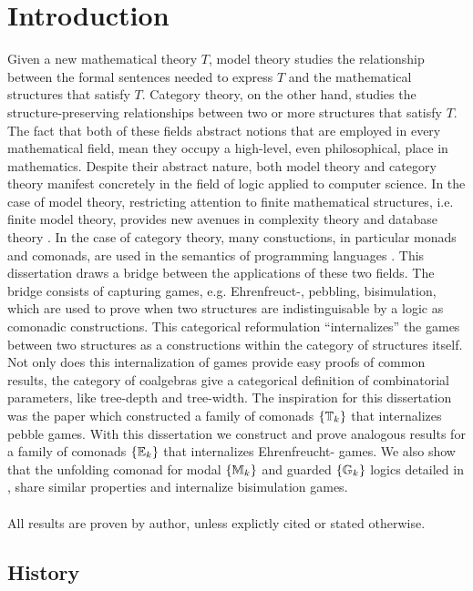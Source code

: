 \chapter{Introduction} 
Given a new mathematical theory $T$, model theory studies the relationship between the formal sentences needed to express $T$ and the mathematical structures that satisfy $T$. Category theory, on the other hand, studies the structure-preserving relationships between two or more structures that satisfy $T$. The fact that both of these fields abstract notions that are employed in every mathematical field, mean they occupy a high-level, even philosophical\cite{Mancosu2010}\cite{Landry2017}, place in mathematics. Despite their abstract nature, both model theory and category theory manifest concretely in the field of logic applied to computer science. In the case of model theory, restricting attention to finite mathematical structures, i.e. finite model theory, provides new avenues in complexity theory \cite{Immerman1998} and database theory \cite{Abiteboul1995}. In the case of category theory, many constuctions, in particular monads and comonads, are used in the semantics of programming languages \cite{BrookesGeva1992}. This dissertation draws a bridge between the applications of these two fields. The bridge consists of capturing games, e.g. Ehrenfreuct-{\Fraisse}, pebbling, bisimulation, which are used to prove when two structures are indistinguisable by a logic as comonadic constructions. This categorical reformulation ``internalizes'' the games between two structures as a constructions within the category of structures itself. Not only does this internalization of games provide easy proofs of common results, the category of coalgebras give a categorical definition of combinatorial parameters, like tree-depth and tree-width. The inspiration for this dissertation was the paper \cite{Abramsky2017} which constructed a family of comonads $\{{\mathbb{T}_{k}}\}$ that internalizes pebble games. With this dissertation we construct and prove analogous results for a family of comonads $\{{\mathbb{E}_{k}}\}$ that internalizes Ehrenfreucht-{\Fraisse} games. We also show that the unfolding comonad for modal $\{{\mathbb{M}_{k}}\}$ and guarded $\{{\mathbb{G}_{k}}\}$ logics detailed in \cite{Gradel2014}, share similar properties and internalize bisimulation games.  
\\~\\
\noindent All results are proven by author, unless explictly cited or stated otherwise. 
\section{History}
